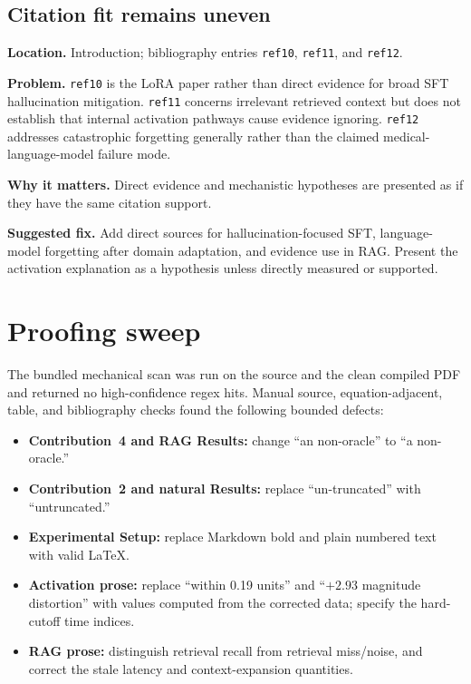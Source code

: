 \documentclass[11pt]{article}
\newcommand{\findinglabel}[1]{\textbf{#1}}
\begin{document}
\subsection*{Citation fit remains uneven}

\findinglabel{Location.} Introduction; bibliography entries \texttt{ref10}, \texttt{ref11}, and \texttt{ref12}.

\findinglabel{Problem.} \texttt{ref10} is the LoRA paper rather than direct evidence for broad SFT hallucination mitigation.  \texttt{ref11} concerns irrelevant retrieved context but does not establish that internal activation pathways cause evidence ignoring.  \texttt{ref12} addresses catastrophic forgetting generally rather than the claimed medical-language-model failure mode.

\findinglabel{Why it matters.} Direct evidence and mechanistic hypotheses are presented as if they have the same citation support.

\findinglabel{Suggested fix.} Add direct sources for hallucination-focused SFT, language-model forgetting after domain adaptation, and evidence use in RAG.  Present the activation explanation as a hypothesis unless directly measured or supported.

\section*{Proofing sweep}

The bundled mechanical scan was run on the source and the clean compiled PDF and returned no high-confidence regex hits.  Manual source, equation-adjacent, table, and bibliography checks found the following bounded defects:

\begin{itemize}
    \item \textbf{Contribution~4 and RAG Results:} change ``an non-oracle'' to ``a non-oracle.''
    \item \textbf{Contribution~2 and natural Results:} replace ``un-truncated'' with ``untruncated.''
    \item \textbf{Experimental Setup:} replace Markdown bold and plain numbered text with valid LaTeX.
    \item \textbf{Activation prose:} replace ``within 0.19 units'' and ``$+2.93$ magnitude distortion'' with values computed from the corrected data; specify the hard-cutoff time indices.
    \item \textbf{RAG prose:} distinguish retrieval recall from retrieval miss/noise, and correct the stale latency and context-expansion quantities.
\end{itemize}
\end{document}
